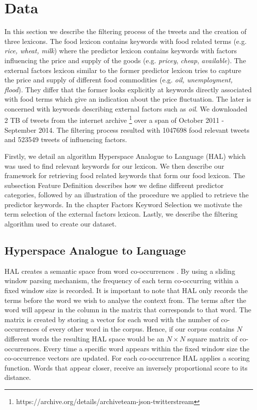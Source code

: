 \chapter{Data}
In this section we describe the filtering process of the tweets and the creation of three lexicons. The food lexicon contains keywords with food related terms (e.g. \emph {rice, wheat, milk}) where the predictor lexicon contains keywords with factors influencing the price and supply of the goods (e.g. \emph{pricey}, \emph {cheap}, \emph{available}). The external factors lexicon similar to the former predictor lexicon tries to capture the price and supply of different food commodities (e.g. \emph{oil, unemployment, flood}). They differ that the former looks explicitly at keywords directly associated with food terms which give an indication about the price fluctuation. The later is concerned with keywords describing external factors such as \emph{oil}. We downloaded 2 TB of tweets from the internet archive \footnote{https://archive.org/details/archiveteam-json-twitterstream} over a span of October 2011 - September 2014.  The filtering process resulted with 1047698 food relevant tweets and 523549 tweets of influencing factors. 

Firstly, we detail an algorithm Hyperspace Analogue to Language (HAL)  \cite{lund96} which was used to find relevant keywords for our lexicon. We then describe our framework for retrieving food related keywords that form our food lexicon. The subsection Feature Definition describes how we define different predictor categories, followed by an illustration of the procedure we applied to retrieve the predictor keywords. In the chapter Factors Keyword Selection we motivate the term selection of the external factors lexicon. Lastly, we describe the filtering algorithm used to create our dataset. 


\section{Hyperspace Analogue to Language}

HAL creates a semantic space from word co-occurrences \cite{lund96}. By using a sliding window parsing mechanism, the frequency of each term co-occurring within a fixed window size is recorded.  It is important to note that HAL only records the terms before the word we wish to analyse the context from. The terms after the word will appear in the column in the matrix that corresponds to that word.  The matrix is created by storing a vector for each word with the number of co-occurrences of every other word in the corpus. Hence, if our corpus contains $N$ different words the resulting HAL space would be an $N \times N$ square matrix of co-occurrences. Every time a specific word appears within the fixed window size the co-occurrence vectors are updated. For each co-occurrence HAL applies a scoring function. Words that appear closer, receive an inversely proportional score to its distance.

